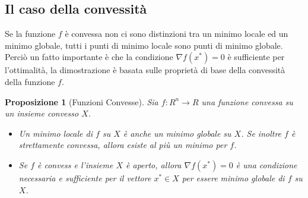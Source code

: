 \documentclass[a4paper, 12pt]{article}
\newtheorem{prop}{Proposizione}
\begin{document}
\subsection{Il caso della convessità}
Se la funzione $f$ è convessa non ci sono distinzioni tra un minimo locale ed un minimo globale, tutti i punti di minimo locale sono punti di minimo globale. Perciò un fatto importante è che la condizione $\nabla f(x^\ast) = 0$ è sufficiente per l'ottimalità, la dimostrazione è basata sulle proprietà di base della convessità della funzione $f$.
\begin{prop}[Funzioni Convesse] Sia $f:R^n \to R$ una funzione convessa su un insieme convesso $X$.
\begin{itemize}
  \item Un minimo locale di $f$ su $X$ è anche un minimo globale su $X$. Se inoltre $f$ è strettamente convessa, allora esiste al più un minimo per $f$.
  \item Se $f$ è convess e l'insieme $X$ è aperto, allora $\nabla f(x^\ast) = 0$ è una condizione necessaria e sufficiente per il vettore $x^\ast \in X$ per essere minimo globale di $f$ su $X$.
\end{itemize}
\end{prop}
\end{document}
